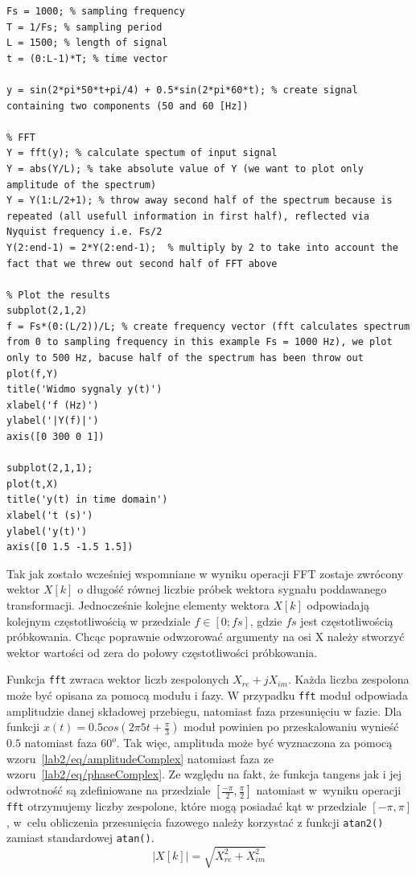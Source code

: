 \begin{lstlisting}[caption=Przykład użycia funkcji \texttt{fft} programu MATLAB/Octave , label=lab2/lst/fftExample]
Fs = 1000; % sampling frequency                    
T = 1/Fs; % sampling period       
L = 1500; % length of signal
t = (0:L-1)*T; % time vector

y = sin(2*pi*50*t+pi/4) + 0.5*sin(2*pi*60*t); % create signal containing two components (50 and 60 [Hz])

% FFT
Y = fft(y); % calculate spectum of input signal
Y = abs(Y/L); % take absolute value of Y (we want to plot only amplitude of the spectrum)
Y = Y(1:L/2+1); % throw away second half of the spectrum because is repeated (all usefull information in first half), reflected via Nyquist frequency i.e. Fs/2
Y(2:end-1) = 2*Y(2:end-1);  % multiply by 2 to take into account the fact that we threw out second half of FFT above

% Plot the results
subplot(2,1,2)
f = Fs*(0:(L/2))/L; % create frequency vector (fft calculates spectrum from 0 to sampling frequency in this example Fs = 1000 Hz), we plot only to 500 Hz, bacuse half of the spectrum has been throw out
plot(f,Y) 
title('Widmo sygnaly y(t)')
xlabel('f (Hz)')
ylabel('|Y(f)|')
axis([0 300 0 1])

subplot(2,1,1);
plot(t,X)
title('y(t) in time domain')
xlabel('t (s)')
ylabel('y(t)')
axis([0 1.5 -1.5 1.5])
\end{lstlisting}



Tak jak zostało wcześniej wspomniane w wyniku operacji FFT zostaje zwrócony wektor $X[k]$ o długość równej liczbie próbek wektora sygnału poddawanego transformacji. Jednocześnie kolejne elementy wektora $X[k]$ odpowiadają kolejnym częstotliwością w przedziale $f\in[0;fs]$, gdzie $fs$ jest częstotliwością próbkowania. Chcąc poprawnie odwzorować argumenty na osi X należy stworzyć wektor wartości od zera do połowy częstotliwości próbkowania.

Funkcja \texttt{fft} zwraca wektor liczb zespolonych $X_{re} + jX_{im}$. Każda liczba zespolona może być opisana za pomocą modułu i fazy. W przypadku \texttt{fft} moduł odpowiada amplitudzie danej składowej przebiegu, natomiast faza przesunięciu w fazie. Dla funkcji $x(t) = 0.5cos(2\pi 5t + \frac{\pi}{3})$ moduł powinien po przeskalowaniu wynieść $0.5$ natomiast faza $60^o$. Tak więc, amplituda może być wyznaczona za pomocą wzoru~\ref{lab2/eq/amplitudeComplex} natomiast faza ze wzoru~\ref{lab2/eq/phaseComplex}. Ze względu na fakt, że funkcja tangens jak i jej odwrotność są zdefiniowane na przedziale $[\frac{-\pi}{2}, \frac{\pi}{2}]$ natomiast w~wyniku operacji \texttt{fft} otrzymujemy liczby zespolone, które mogą posiadać kąt w przedziale $[-\pi, \pi]$, w~celu obliczenia przesunięcia fazowego należy korzystać z funkcji \texttt{atan2()} zamiast standardowej \texttt{atan()}.
\begin{equation}\label{lab2/eq/amplitudeComplex}
	|X[k]| = \sqrt{X^2 _{re} + X^2 _{im}}
\end{equation}

